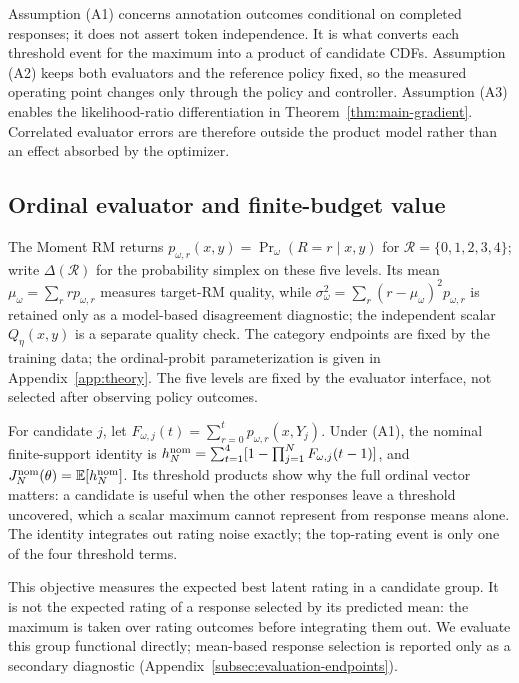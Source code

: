 \documentclass{article}
\theoremstyle{definition}
\theoremstyle{remark}
\begin{document}
Assumption (A1) concerns annotation outcomes conditional on completed
responses; it does not assert token independence.  It is what converts each
threshold event for the maximum into a product of candidate CDFs.  Assumption
(A2) keeps both evaluators and the reference policy fixed, so the measured
operating point changes only through the policy and controller.  Assumption (A3) enables
the likelihood-ratio differentiation in Theorem~\ref{thm:main-gradient}.
Correlated evaluator errors are therefore outside the product model rather than
an effect absorbed by the optimizer.

\subsection{Ordinal evaluator and finite-budget value}
The Moment RM returns \(p_{\omega,r}(x,y)=\Pr_\omega(R=r\mid x,y)\) for
\(\mathcal R=\{0,1,2,3,4\}\); write \(\Delta(\mathcal R)\) for the probability
simplex on these five levels.  Its mean
\(\mu_\omega=\sum_r rp_{\omega,r}\) measures target-RM quality, while
\(\sigma_\omega^2=\sum_r(r-\mu_\omega)^2p_{\omega,r}\) is retained only as a
model-based disagreement diagnostic; the independent scalar \(Q_\eta(x,y)\) is a
separate quality check.  The category endpoints are fixed by the training data;
the ordinal-probit parameterization is given in Appendix~\ref{app:theory}.
The five levels are fixed by the evaluator interface, not selected after
observing policy outcomes.

For candidate \(j\), let \(F_{\omega,j}(t)=\sum_{r=0}^{t}p_{\omega,r}(x,Y_j)\).
Under (A1), the nominal finite-support identity is
\(h_N^{\rm nom}=\sum_{t=1}^{4}[1-\prod_{j=1}^{N}F_{\omega,j}(t-1)]\), and
\(J_N^{\rm nom}(\theta)=\mathbb E[h_N^{\rm nom}]\).  Its threshold products
show why the full ordinal vector matters: a candidate is useful when the other
responses leave a threshold uncovered, which a scalar maximum cannot represent
from response means alone. The identity integrates out rating noise exactly;
the top-rating event is only one of the four threshold terms.

This objective measures the expected best latent rating in a candidate group.
It is not the expected rating of a response selected by its predicted mean:
the maximum is taken over rating outcomes before integrating them out.
We evaluate this group functional directly; mean-based response selection is
reported only as a secondary diagnostic
(Appendix~\ref{subsec:evaluation-endpoints}).
\end{document}
